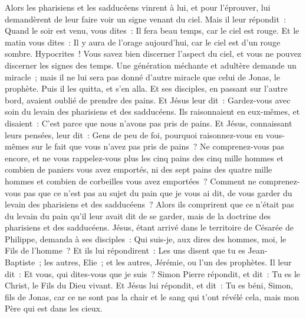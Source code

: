 \begin{multicols}{2}
\VerseOne{}Alors les pharisiens et les sadducéens vinrent à lui, et pour l'éprouver, lui demandèrent de leur faire voir un signe venant du ciel.
Mais il leur répondit~: Quand le soir est venu, vous dites~: Il fera beau temps, car le ciel est rouge.
Et le matin vous dites~: Il y aura de l'orage aujourd'hui, car le ciel est d'un rouge sombre. Hypocrites~! Vous savez bien discerner l'aspect du ciel, et vous ne pouvez discerner les signes des temps.
Une génération méchante et adultère demande un miracle~; mais il ne lui sera pas donné d'autre miracle que celui de Jonas, le prophète. Puis il les quitta, et s'en alla.
Et ses disciples, en passant sur l'autre bord, avaient oublié de prendre des pains.
Et Jésus leur dit~: Gardez-vous avec soin du levain des pharisiens et des sadducéens.
Ils raisonnaient en eux-mêmes, et disaient~: C'est parce que nous n'avons pas pris de pains.
Et Jésus, connaissant leurs pensées, leur dit~: Gens de peu de foi, pourquoi raisonnez-vous en vous-mêmes sur le fait que vous n'avez pas pris de pains~?
Ne comprenez-vous pas encore, et ne vous rappelez-vous plus les cinq pains des cinq mille hommes et combien de paniers vous avez emportés,
ni des sept pains des quatre mille hommes et combien de corbeilles vous avez emportées~?
Comment ne comprenez-vous pas que ce n'est pas au sujet du pain que je vous ai dit, de vous garder du levain des pharisiens et des sadducéens~?
Alors ils comprirent que ce n'était pas du levain du pain qu'il leur avait dit de se garder, mais de la doctrine des pharisiens et des sadducéens.
Jésus, étant arrivé dans le territoire de Césarée de Philippe, demanda à ses disciples~: Qui suis-je, aux dires des hommes, moi, le Fils de l'homme~?
Et ils lui répondirent~: Les uns disent que tu es Jean-Baptiste~; les autres, Elie~; et les autres, Jérémie, ou l'un des prophètes.
Il leur dit~: Et vous, qui dites-vous que je suis~?
Simon Pierre répondit, et dit~: Tu es le Christ, le Fils du Dieu vivant.
Et Jésus lui répondit, et dit~: Tu es béni, Simon, fils de Jonas, car ce ne sont pas la chair et le sang qui t'ont révélé cela, mais mon Père qui est dans les cieux.

\end{multicols}
